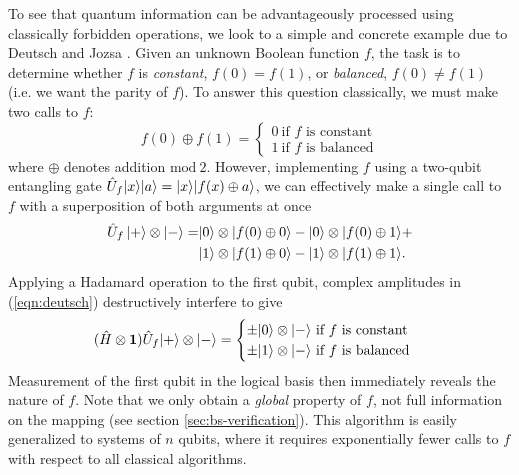 To see that quantum information can be advantageously processed using classically forbidden operations, we look to a simple and concrete example due to Deutsch and Jozsa \cite{Deutsch1985}. Given an unknown Boolean function $f$, the task is to determine whether $f$ is \emph{constant}, $f(0)=f(1)$, or \emph{balanced}, $f(0)\ne f(1)$ (i.e. we want the parity of $f$).
To answer this question classically, we must make two calls to $f$:
\begin{equation}
    f(0) \oplus f(1) = 
    \begin{cases}
    0~\text{if $f$ is constant}\\
    1~\text{if $f$ is balanced}
    \end{cases}
\end{equation}
where $\oplus$ denotes addition $\mathrm{mod}~2$. However, implementing $f$ using a two-qubit entangling gate $\hat{U}_f \mbox{$ | x \rangle $} \mbox{$ | a \rangle $} = \mbox{$ | x \rangle $}  \mbox{$ | f(x) \oplus a \rangle $}$,
we can effectively make a single call to $f$ with a superposition of both arguments at once
\begin{align}
    \hat{U}_f \, \mbox{$ | + \rangle $} \otimes \mbox{$ | - \rangle $} = 
    &\mbox{$ | 0 \rangle $}\otimes\mbox{$ | f(0) \oplus 0 \rangle $}-
    \mbox{$ | 0 \rangle $}\otimes\mbox{$ | f(0) \oplus 1 \rangle $}+\\
    &\mbox{$ | 1 \rangle $}\otimes\mbox{$ | f(1) \oplus 0 \rangle $}-
    \mbox{$ | 1 \rangle $}\otimes\mbox{$ | f(1) \oplus 1 \rangle $}.
    \label{eqn:deutsch}
\end{align}
Applying a Hadamard operation to the first qubit, complex amplitudes in (\ref{eqn:deutsch}) destructively interfere to give
\begin{equation}
  (\hat{H}  \otimes \mathbf{1}) \hat{U}_f \mbox{$ | + \rangle $}\otimes \mbox{$ | - \rangle $} = 
    \begin{cases}
    \pm \mbox{$ | 0 \rangle $} \otimes \mbox{$ | - \rangle $} ~\text{if $f$ is constant}\\
    \pm \mbox{$ | 1 \rangle $} \otimes \mbox{$ | - \rangle $} ~\text{if $f$ is balanced}
    \end{cases}
\end{equation}
Measurement of the first qubit in the logical basis then immediately reveals the nature of $f$. Note that we only obtain a \emph{global} property of $f$, not full information on the mapping (see section \ref{sec:bs-verification}). This algorithm is easily generalized to systems of $n$ qubits, where it requires exponentially fewer calls to $f$ with respect to all classical algorithms. 

